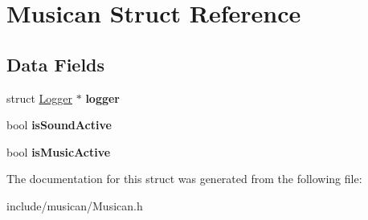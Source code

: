 \hypertarget{struct_musican}{}\section{Musican Struct Reference}
\label{struct_musican}
\subsection*{Data Fields}
\begin{DoxyCompactItemize}
\item 
\hypertarget{struct_musican_af4d650f26e6e1a4b53c751abc1eff45e}{}\label{struct_musican_af4d650f26e6e1a4b53c751abc1eff45e} 
struct \hyperlink{struct_logger}{Logger} $\ast$ {\bfseries logger}
\item 
\hypertarget{struct_musican_a5c6626343a76aeeea67da93f5e14fd45}{}\label{struct_musican_a5c6626343a76aeeea67da93f5e14fd45} 
bool {\bfseries is\+Sound\+Active}
\item 
\hypertarget{struct_musican_abc26db848e0a6faf8a443fefaeb42f50}{}\label{struct_musican_abc26db848e0a6faf8a443fefaeb42f50} 
bool {\bfseries is\+Music\+Active}
\end{DoxyCompactItemize}


The documentation for this struct was generated from the following file\+:\begin{DoxyCompactItemize}
\item 
include/musican/Musican.\+h\end{DoxyCompactItemize}
